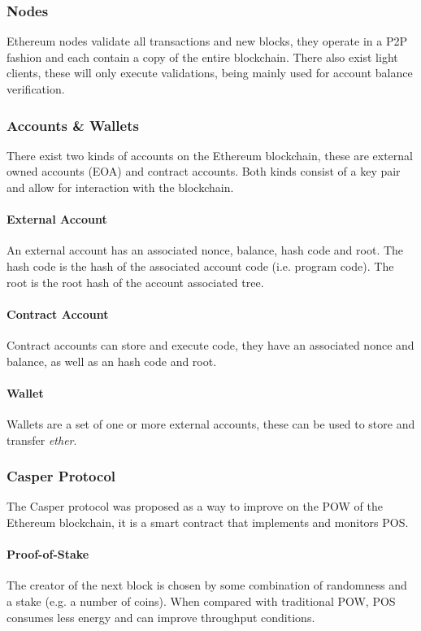 \subsubsection{Nodes}
Ethereum nodes validate all transactions and new blocks,
they operate in a P2P fashion and each contain a copy of the entire blockchain.
There also exist light clients, these will only execute validations, being mainly used for account balance verification.

\subsubsection{Accounts \& Wallets}
There exist two kinds of accounts on the Ethereum blockchain,
these are external owned accounts (EOA) and contract accounts.
Both kinds consist of a key pair and allow for interaction with the blockchain.

\paragraph{External Account}
An external account has an associated nonce, balance, hash code and root.
The hash code is the hash of the associated account code (i.e. program code).
The root is the root hash of the account associated tree.

\paragraph{Contract Account}
Contract accounts can store and execute code,
they have an associated nonce and balance,
as well as an hash code and root.

\paragraph{Wallet}
Wallets are a set of one or more external accounts,
these can be used to store and transfer \textit{ether}.

\subsubsection{Casper Protocol}
The Casper protocol was proposed as a way to improve on the POW of the Ethereum blockchain,
it is a smart contract that implements and monitors POS.

\paragraph{Proof-of-Stake}
The creator of the next block is chosen by some combination of randomness and a stake (e.g. a number of coins).
When compared with traditional POW, POS consumes less energy and can improve throughput conditions.

